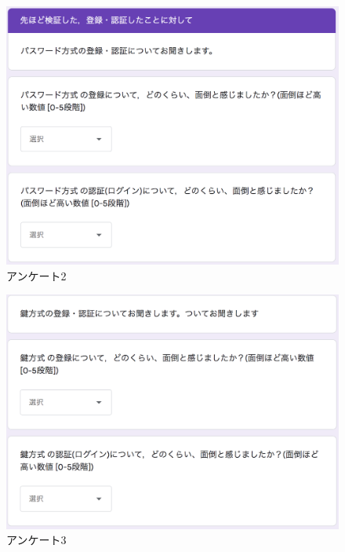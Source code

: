     \vspace{4cm}%
    \begin{figure}[H]
        \includegraphics[width=15cm]{./fig/chapter4/inspect_1/questionnaire/questionnaire_2.png}
        \caption{アンケート2}
        \label{アンケート２}
    \end{figure}

    \vspace{4cm}%
    \begin{figure}[H]
        \includegraphics[width=15cm]{./fig/chapter4/inspect_1/questionnaire/questionnaire_3.png}
        \caption{アンケート3}
        \label{アンケート３}
    \end{figure}

